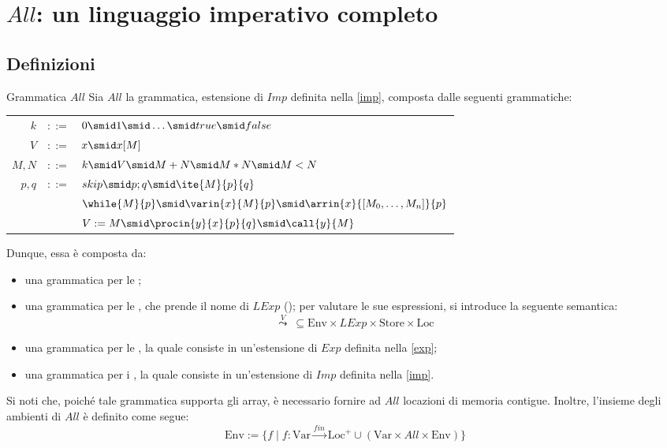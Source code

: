 \documentclass[a4paper, 12pt]{report}
\begin{document}
    \section{$All$: un linguaggio imperativo completo}

    \subsection{Definizioni}

    \begin{frameddefn}[label={all}]{Grammatica $All$}
        Sia $All$ la grammatica, estensione di $Imp$ definita nella \cref{imp}, composta dalle seguenti grammatiche:

        \begin{center}
            \begin{tabular}{rcl}
                $k$ & $::=$ & $0 \smid 1 \smid \ldots \smid true \smid false$ \\
                $V$ & $::=$ & $x \smid x[M]$ \\
                $M, N$ & $::=$ & $k \smid V \smid M + N \smid M * N \smid M   <  N$ \\
                $p,q$ & $::=$ & $skip \smid p;q \smid \ite{M}{p}{q}$ \\
                      & & $\while{M}{p} \smid \varin{x}{M}{p} \smid \arrin{x}{[M_0, \ldots, M_n]}{p}$ \\
                      & & $V := M \smid \procin{y}{x}{p}{q} \smid \call{y}{M}$ \\
            \end{tabular}
        \end{center}

        Dunque, essa è composta da:

        \begin{itemize}
            \item una grammatica per le ;
            \item una grammatica per le , che prende il nome di $LExp$ (); per valutare le sue espressioni, si introduce la seguente semantica: $$\stackrel{V}{\leadsto} \ \subseteq \mathrm{Env} \times LExp \times \mathrm{Store} \times \mathrm{Loc}$$
            \item una grammatica per le , la quale consiste in un'estensione di $Exp$ definita nella \cref{exp};
            \item una grammatica per i , la quale consiste in un'estensione di $Imp$ definita nella \cref{imp}.
        \end{itemize}

        Si noti che, poiché tale grammatica supporta gli array, è necessario fornire ad $All$ locazioni di memoria contigue. Inoltre, l'insieme degli ambienti di $All$ è definito come segue: $$\mathrm{Env} := \{f \mid f : \mathrm{Var} \xrightarrow{fin} \mathrm{Loc}^+ \cup (\mathrm{Var} \times All \times \mathrm{Env})\}$$
    \end{frameddefn}
\end{document}
